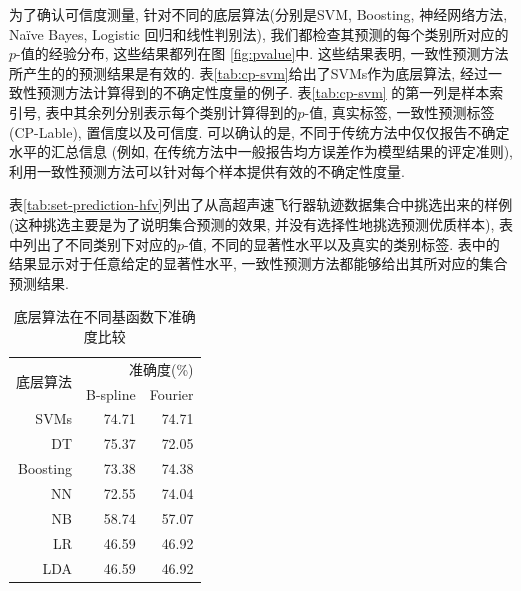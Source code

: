 为了确认可信度测量, 针对不同的底层算法(分别是SVM, Boosting, 神经网络方法, Na\"{i}ve Bayes, Logistic 回归和线性判别法), 我们都检查其预测的每个类别所对应的$p$-值的经验分布, 这些结果都列在图 \ref{fig:pvalue}中. 这些结果表明, 一致性预测方法所产生的的预测结果是有效的. 表\ref{tab:cp-svm}给出了SVMs作为底层算法, 经过一致性预测方法计算得到的不确定性度量的例子. 表\ref{tab:cp-svm} 的第一列是样本索引号, 表中其余列分别表示每个类别计算得到的$p$-值, 真实标签, 一致性预测标签 (CP-Lable), 置信度以及可信度. 可以确认的是, 不同于传统方法中仅仅报告不确定水平的汇总信息 (例如, 在传统方法中一般报告均方误差作为模型结果的评定准则), 利用一致性预测方法可以针对每个样本提供有效的不确定性度量. 

表\ref{tab:set-prediction-hfv}列出了从高超声速飞行器轨迹数据集合中挑选出来的样例 (这种挑选主要是为了说明集合预测的效果, 并没有选择性地挑选预测优质样本), 表中列出了不同类别下对应的$p$-值, 不同的显著性水平以及真实的类别标签. 表中的结果显示对于任意给定的显著性水平, 一致性预测方法都能够给出其所对应的集合预测结果.

\begin{table}[]
\centering
\caption{底层算法在不同基函数下准确度比较}
\label{tab:accuracy}
\begin{tabular}{@{}r|rr@{}}
\toprule
\multirow{2}{*}{底层算法} & \multicolumn{2}{r}{准确度(\%)} \\ \cmidrule(l){2-3}
		& B-spline        & Fourier        \\ \midrule
SVMs    & 74.71           & 74.71          \\
DT		& 75.37			& 72.05			 \\
Boosting& 73.38           & 74.38          \\
NN      & 72.55           & 74.04          \\
NB      & 58.74           & 57.07          \\
LR      & 46.59           & 46.92          \\
LDA     & 46.59           & 46.92          \\ \bottomrule
\end{tabular}
\end{table}

%

